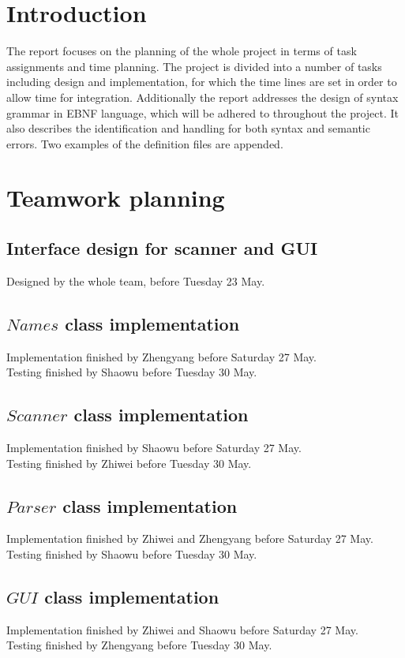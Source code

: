 \documentclass[12pt]{article}
\begin{document}
\section{Introduction}
The report focuses on the planning of the whole project in terms of task assignments and time planning. The project is divided into a number of 
tasks including design and implementation, for which the time lines are set in order to allow time for integration. Additionally the report 
addresses the design of syntax grammar in EBNF language, which will be adhered to throughout the project. It also describes the identification 
and handling for both syntax and semantic errors. Two examples of the definition files are appended.

\section{Teamwork planning}
\subsection{Interface design for scanner and GUI}
Designed by the whole team, before Tuesday 23 May.\\

\subsection{$Names$ class implementation}
Implementation finished by Zhengyang before Saturday 27 May.\\
Testing finished by Shaowu before Tuesday 30 May.

\subsection{$Scanner$ class implementation}
Implementation finished by Shaowu before Saturday 27 May.\\
Testing finished by Zhiwei before Tuesday 30 May.

\subsection{$Parser$ class implementation}
Implementation finished by Zhiwei and Zhengyang before Saturday 27 May.\\
Testing finished by Shaowu before Tuesday 30 May.

\subsection{$GUI$ class implementation}
Implementation finished by Zhiwei and Shaowu before Saturday 27 May.\\
Testing finished by Zhengyang before Tuesday 30 May.
\end{document}
